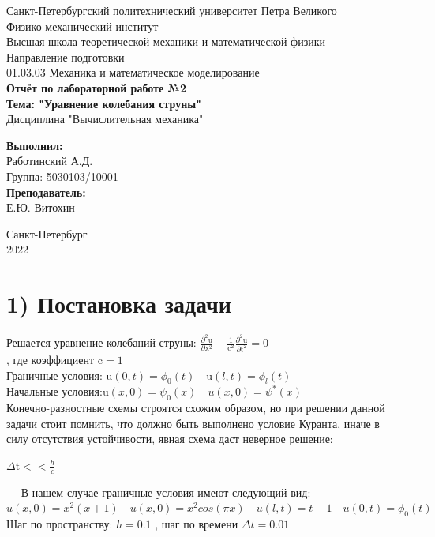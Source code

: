 \documentclass[]{article}
\begin{document}
	\begin{titlepage}
		\begin{center}
			\large Санкт-Петербургский политехнический университет Петра Великого \\
			\large Физико-механический институт \\
			\large Высшая школа теоретической механики и математической физики \\[2cm] %
			\large Направление подготовки \\
			\large 01.03.03 Механика и математическое моделирование \\[2cm]
			\LARGE \textbf {Отчёт по лабораторной работе №2} \\[0.5cm]
			\LARGE \textbf {Тема: "Уравнение колебания струны"} \\[0.5cm]
			\large Дисциплина "Вычислительная механика" \\[4cm]
		\end{center}
			\begin{minipage}{0.25\textwidth} %
				\begin{flushright}
				\large\textbf{Выполнил:}\\
				\large Работинский А.Д. \\
				\large {Группа:} 5030103/10001 \\
				\large \textbf{Преподаватель:}\\
				\large Е.Ю. Витохин
			\end{flushright}
		\end{minipage}
	\mbox{}
	\vfill
\begin{center}
	\large Санкт-Петербург \\
	\large 2022 
\end{center} 
	\end{titlepage}
	
	\newpage
	\section*{1) Постановка задачи}
		Решается уравнение колебаний струны:
		$\frac{\partial^2{\text{u}}}{\partial{\text{x}^2}}-\frac{1}{\text{c}^2}\frac{\partial^2{\text{u}}}{\partial{\text{t}^2}}=0$ \\
		, где коэффициент $\text{c}=1$\\
		Граничные условия: $\text{u}(0,t)=\phi_0(t) \quad \text{u}(l,t)=\phi_l(t)$\\
		Начальные условия:$\text{u}(x,0)=\psi_0(x) \quad \dot{u}(x,0)=\psi^*(x)$\\
		Конечно-разностные схемы строятся схожим образом, но при решении данной задачи стоит помнить, что должно быть выполнено условие Куранта, иначе в силу отсутствия  устойчивости, явная схема даст неверное решение: \begin{center}
			$\Delta\text{t}<<\frac{h}{c}$
		\end{center}
		$\quad$ В нашем случае граничные условия имеют следующий вид:\\
		\mbox{$\dot{u}(x,0)=x^2(x+1) \quad u(x,0)=x^2cos(\pi x) \quad u(l,t)=t-1 \quad u(0,t)=\phi_0(t)$}
		Шаг по пространству: $h=0.1 $ , шаг по времени \mbox{$\Delta t =0.01$} 
		
\end{document}

